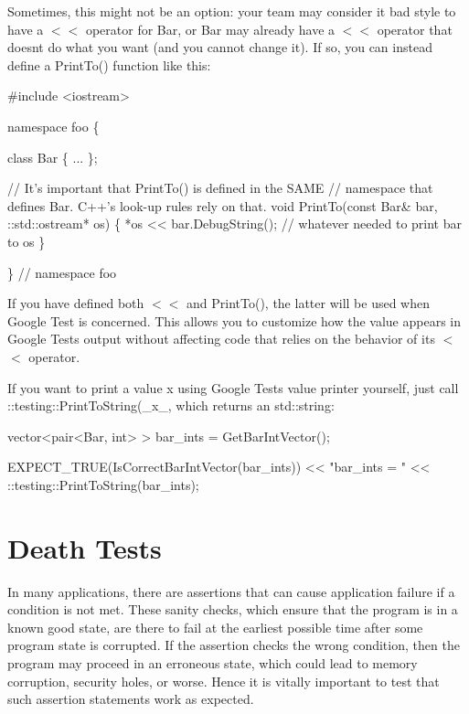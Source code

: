 Sometimes, this might not be an option\+: your team may consider it bad style to have a {\ttfamily $<$$<$} operator for {\ttfamily Bar}, or {\ttfamily Bar} may already have a {\ttfamily $<$$<$} operator that doesn\textquotesingle{}t do what you want (and you cannot change it). If so, you can instead define a {\ttfamily Print\+To()} function like this\+:


\begin{DoxyCode}
#include <iostream>

namespace foo \{

class Bar \{ ... \};

// It's important that PrintTo() is defined in the SAME
// namespace that defines Bar.  C++'s look-up rules rely on that.
void PrintTo(const Bar& bar, ::std::ostream* os) \{
  *os << bar.DebugString();  // whatever needed to print bar to os
\}

\}  // namespace foo
\end{DoxyCode}


If you have defined both {\ttfamily $<$$<$} and {\ttfamily Print\+To()}, the latter will be used when Google Test is concerned. This allows you to customize how the value appears in Google Test\textquotesingle{}s output without affecting code that relies on the behavior of its {\ttfamily $<$$<$} operator.

If you want to print a value {\ttfamily x} using Google Test\textquotesingle{}s value printer yourself, just call {\ttfamily \+::testing\+::\+Print\+To\+String(}\+\_\+x\+\_\+{\ttfamily )}, which returns an {\ttfamily std\+::string}\+:


\begin{DoxyCode}
vector<pair<Bar, int> > bar\_ints = GetBarIntVector();

EXPECT\_TRUE(IsCorrectBarIntVector(bar\_ints))
    << "bar\_ints = " << ::testing::PrintToString(bar\_ints);
\end{DoxyCode}


\section*{Death Tests}

In many applications, there are assertions that can cause application failure if a condition is not met. These sanity checks, which ensure that the program is in a known good state, are there to fail at the earliest possible time after some program state is corrupted. If the assertion checks the wrong condition, then the program may proceed in an erroneous state, which could lead to memory corruption, security holes, or worse. Hence it is vitally important to test that such assertion statements work as expected.

